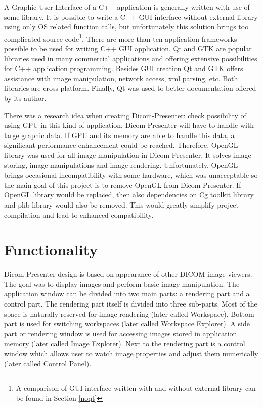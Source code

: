 A Graphic User Interface of a C++ application is generally written with use of some library. It is possible to write a C++ GUI interface without external library using only OS related function calls, but unfortunately this solution brings too complicated source code\footnote{A comparison of GUI interface written with and without external library can be found in Section \ref{noqt}}. There are more than ten application frameworks possible to be used for writing C++ GUI application. Qt and GTK are popular libraries used in many commercial applications and offering extensive possibilities for C++ application programming\cite{xxxxx}. Besides GUI creation Qt and GTK offers assistance with image manipulation, network access, xml parsing, etc. Both libraries are cross-platform. Finally, Qt was used to better documentation offered by its author.

There was a research idea when creating Dicom-Presenter: check possibility of using GPU in this kind of application. Dicom-Presenter will have to handle with large graphic data. If GPU and its memory are able to handle this data, a significant performance enhancement could be reached. Therefore, OpenGL library was used for all image manipulation in Dicom-Presenter. It solves image storing, image manipulations and image rendering. Unfortunately, OpenGL brings occasional incompatibility with some hardware, which was unacceptable so the main goal of this project is to remove OpenGL from Dicom-Presenter. If OpenGL library would be replaced, then also dependencies on Cg toolkit library and plib library would also be removed. This would greatly simplify project compilation and lead to enhanced compatibility.



\section{Functionality}
\label{dicom-presenter}
Dicom-Presenter design is based on appearance of other DICOM image viewers. The goal was to display images and perform basic image manipulation. The application window can be divided into two main parts: a rendering part and a control part. The rendering part itself is divided into three sub-parts. Most of the space is naturally reserved for image rendering (later called Workspace). Bottom part is used for switching workspaces (later called Workspace Explorer). A side part or rendering window is used for accessing images stored in application memory (later called Image Explorer). Next to the rendering part is a control window which allows user to watch image  properties and adjust them numerically (later called Control Panel). 

